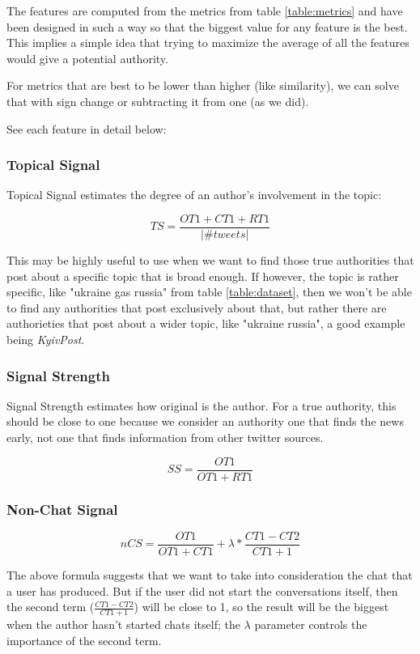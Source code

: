 The features are computed from the metrics from table \ref{table:metrics} and have been designed in such a way so that the biggest value for any feature is the best. This implies a simple idea that trying to maximize the average of all the features would give a potential authority.

For metrics that are best to be lower than higher (like similarity), we can solve that with sign change or subtracting it from one (as we did).

See each feature in detail below:

\subsubsection{Topical Signal}

Topical Signal estimates the degree of an author's involvement in the topic:

$$TS = \frac{OT1 + CT1 + RT1}{|\#tweets|}$$

This may be highly useful to use when we want to find those true authorities that post about a specific topic that is broad enough. If however, the topic is rather specific, like "ukraine gas russia" from table \ref{table:dataset}, then we won't be able to find any authorities that post exclusively about that, but rather there are authorieties that post about a wider topic, like "ukraine russia", a good example being \textit{KyivPost}.

\subsubsection{Signal Strength}

Signal Strength estimates how original is the author. For a true authority, this should be close to one because we consider an authority one that finds the news early, not one that finds information from other twitter sources.

$$SS = \frac{OT1}{OT1 + RT1}$$

\subsubsection{Non-Chat Signal}

$$nCS = \frac{OT1}{OT1 + CT1} + \lambda * \frac{CT1 - CT2}{CT1 + 1}$$

The above formula suggests that we want to take into consideration the chat that a user has produced. But if the user did not start the conversations itself, then the second term ($\frac{CT1 - CT2}{CT1 + 1}$) will be close to 1, so the result will be the biggest when the author hasn't started chats itself; the $\lambda$ parameter controls the importance of the second term.

